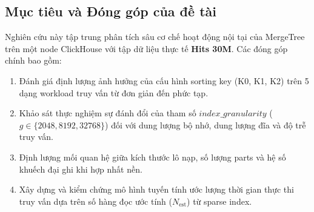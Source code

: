 \subsection{Mục tiêu và Đóng góp của đề tài}
Nghiên cứu này tập trung phân tích sâu cơ chế hoạt động nội tại của MergeTree trên một node ClickHouse với tập dữ liệu thực tế \textbf{Hits 30M}. Các đóng góp chính bao gồm:
\begin{enumerate}
    \item Đánh giá định lượng ảnh hưởng của cấu hình sorting key (K0, K1, K2) trên 5 dạng workload truy vấn từ đơn giản đến phức tạp.
    \item Khảo sát thực nghiệm sự đánh đổi của tham số $index\_granularity$ ($g \in \{2048, 8192, 32768\}$) đối với dung lượng bộ nhớ, dung lượng đĩa và độ trễ truy vấn.
    \item Định lượng mối quan hệ giữa kích thước lô nạp, số lượng parts và hệ số khuếch đại ghi khi hợp nhất nền.
    \item Xây dựng và kiểm chứng mô hình tuyến tính ước lượng thời gian thực thi truy vấn dựa trên số hàng đọc ước tính ($N_{\text{est}}$) từ sparse index.
\end{enumerate}
